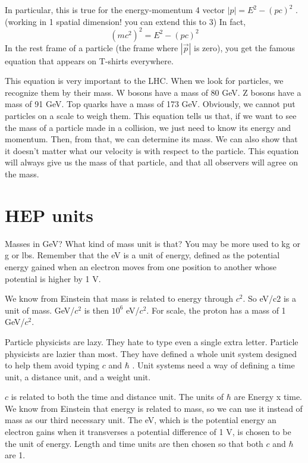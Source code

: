 In particular, this is true for the energy-momentum 4 vector  $|p| = E^2 - (pc)^2$  . (working in 1 spatial dimension! you can extend this to 3)  In fact, 
\begin{equation}
	  	(mc^2)^2 = E^2 -(pc)^2
\end{equation}  
In the rest frame of a particle (the frame where  $|\vec p |$  is zero), you get the famous equation that appears on T-shirts everywhere.

This equation is very important to the LHC.  When we look for particles, we recognize them by their mass.  W bosons have a mass of 80 GeV.  Z bosons have a mass of 91 GeV.  Top quarks have a mass of 173 GeV.  Obviously, we cannot put particles on a scale to weigh them. This equation tells us that, if we want to see the mass of a particle made in a collision, we just need to know its energy and momentum.  Then, from that, we can determine its mass.  We can also show that it doesn't matter what our velocity is with respect to the particle.  This equation will always give us the mass of that particle, and that all observers will agree on the mass.

\section{HEP units}

Masses in GeV?  What kind of mass unit is that? You may be more used to kg or g or lbs.  Remember that the eV is a unit of energy, defined as the potential energy gained when an electron moves from one position to another whose potential is higher by 1 V.

We know from Einstein that mass is related to energy through $c^2$.  So eV/c2 is a unit of mass.  GeV/$c^2$ is then $10^6$ eV/$c^2$.  For scale, the proton has a mass of 1 GeV/$c^2$.

Particle physicists are lazy.  They hate to type even a single extra letter.  Particle physicists are lazier than most.  They have defined a whole unit system designed to help them avoid typing $c$ and $\hbar$ .  Unit systems need a way of defining a time unit, a distance unit, and a weight unit.  

$c$ is related to both the time and distance unit.  The units of  $\hbar$ are Energy x time. We know from Einstein that energy is related to mass, so we can use it instead of mass as our third necessary unit.  The eV, which is the potential energy an electron gains when it transverses a potential difference of 1 V, is chosen to be the unit of energy. Length and time units are then chosen so that both $c$ and $\hbar$  are 1.  


